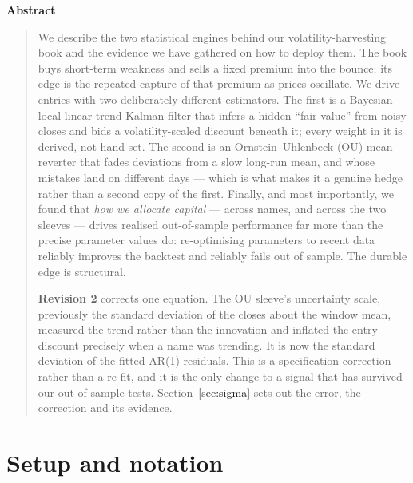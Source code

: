 \documentclass[11pt]{article}
\begin{document}
\begin{center}\textbf{Abstract}\end{center}
\begin{quote}\small
We describe the two statistical engines behind our volatility-harvesting book and the evidence we
have gathered on how to deploy them. The book buys short-term weakness and sells a fixed premium
into the bounce; its edge is the repeated capture of that premium as prices oscillate. We drive
entries with two deliberately different estimators. The first is a Bayesian local-linear-trend
Kalman filter that infers a hidden ``fair value'' from noisy closes and bids a volatility-scaled
discount beneath it; every weight in it is derived, not hand-set. The second is an
Ornstein--Uhlenbeck (OU) mean-reverter that fades deviations from a slow long-run mean, and whose
mistakes land on different days --- which is what makes it a genuine hedge rather than a second
copy of the first. Finally, and most importantly, we found that \emph{how we allocate capital}
--- across names, and across the two sleeves --- drives realised out-of-sample performance far
more than the precise parameter values do: re-optimising parameters to recent data reliably
improves the backtest and reliably fails out of sample. The durable edge is structural.

\textbf{Revision 2} corrects one equation. The OU sleeve's uncertainty scale, previously the
standard deviation of the closes about the window mean, measured the trend rather than the
innovation and inflated the entry discount precisely when a name was trending. It is now the
standard deviation of the fitted AR(1) residuals. This is a specification correction rather than
a re-fit, and it is the only change to a signal that has survived our out-of-sample tests.
Section~\ref{sec:sigma} sets out the error, the correction and its evidence.
\end{quote}

\tableofcontents
\newpage

\section{Setup and notation}
\end{document}
